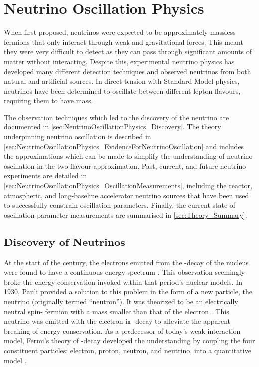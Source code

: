 \chapter{Neutrino Oscillation Physics}
\label{chap:NeutrinoOscillationPhysics}

When first proposed, neutrinos were expected to be approximately massless fermions that only interact through weak and gravitational forces. This meant they were very difficult to detect as they can pass through significant amounts of matter without interacting. Despite this, experimental neutrino physics has developed many different detection techniques and observed neutrinos from both natural and artificial sources. In direct tension with Standard Model physics, neutrinos have been determined to oscillate between different lepton flavours, requiring them to have mass. 

The observation techniques which led to the discovery of the neutrino are documented in \autoref{sec:NeutrinoOscillationPhysics_Discovery}. The theory underpinning neutrino oscillation is described in \autoref{sec:NeutrinoOscillationPhysics_EvidenceForNeutrinoOscillation} and includes the approximations which can be made to simplify the understanding of neutrino oscillation in the two-flavour approximation. Past, current, and future neutrino experiments are detailed in \autoref{sec:NeutrinoOscillationPhysics_OscillationMeasurements}, including the reactor, atmospheric, and long-baseline accelerator neutrino sources that have been used to successfully constrain oscillation parameters. Finally, the current state of oscillation parameter measurements are summarised in \autoref{sec:Theory_Summary}.

\section{Discovery of Neutrinos}
\label{sec:NeutrinoOscillationPhysics_Discovery}

At the start of the  century, the electrons emitted from the \quickmath{\beta}-decay of the nucleus were found to have a continuous energy spectrum \cite{Chadwick:262756, Ellis1927-qf}. This observation seemingly broke the energy conservation invoked within that period's nuclear models. In 1930, Pauli provided a solution to this problem in the form of a new particle, the neutrino (originally termed ``neutron''). It was theorized to be an electrically neutral spin- fermion with a mass smaller than that of the electron \cite{Pauli:1930pc}. This neutrino was emitted with the electron in \quickmath{\beta}-decay to alleviate the apparent breaking of energy conservation. As a predecessor of today's weak interaction model, Fermi's theory of \quickmath{\beta}-decay developed the understanding by coupling the four constituent particles: electron, proton, neutron, and neutrino, into a quantitative model \cite{Fermi:1934hr}.

